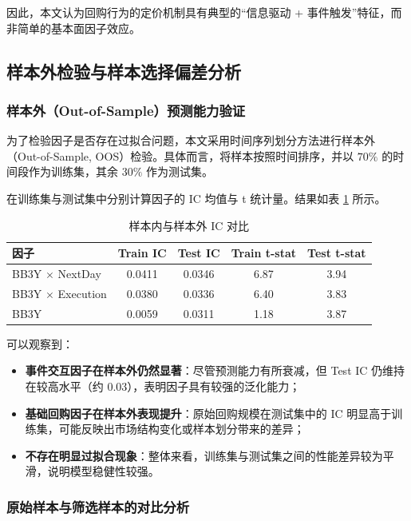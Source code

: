 \documentclass[a4paper,10pt]{article}
\begin{document}
因此，本文认为回购行为的定价机制具有典型的“信息驱动 + 事件触发”特征，而非简单的基本面因子效应。



\subsection{样本外检验与样本选择偏差分析}

\subsubsection{样本外（Out-of-Sample）预测能力验证}

为了检验因子是否存在过拟合问题，本文采用时间序列划分方法进行样本外（Out-of-Sample, OOS）检验。具体而言，将样本按照时间排序，并以 $70\%$ 的时间段作为训练集，其余 $30\%$ 作为测试集。

在训练集与测试集中分别计算因子的 IC 均值与 t 统计量。结果如表 \ref{tab:oos_result} 所示。

\begin{table}[H]
\centering
\caption{样本内与样本外 IC 对比}
\label{tab:oos_result}
\begin{tabular}{lcccc}
\toprule
因子 & Train IC & Test IC & Train t-stat & Test t-stat \\
\midrule
BB3Y $\times$ NextDay & 0.0411 & 0.0346 & 6.87 & 3.94 \\
BB3Y $\times$ Execution & 0.0380 & 0.0336 & 6.40 & 3.83 \\
BB3Y & 0.0059 & 0.0311 & 1.18 & 3.87 \\
\bottomrule
\end{tabular}
\end{table}

可以观察到：

\begin{itemize}
    \item \textbf{事件交互因子在样本外仍然显著}：尽管预测能力有所衰减，但 Test IC 仍维持在较高水平（约 0.03），表明因子具有较强的泛化能力；
    
    \item \textbf{基础回购因子在样本外表现提升}：原始回购规模在测试集中的 IC 明显高于训练集，可能反映出市场结构变化或样本划分带来的差异；
    
    \item \textbf{不存在明显过拟合现象}：整体来看，训练集与测试集之间的性能差异较为平滑，说明模型稳健性较强。
\end{itemize}

\subsubsection{原始样本与筛选样本的对比分析}
\end{document}
